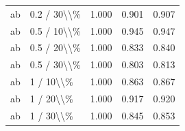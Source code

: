 \begin{table}[!h]
\begin{tabular}[t]{llccc}
\addlinespace
ab & 0.2 / 30\textbackslash{}\textbackslash{}\% & 1.000 & 0.901 & 0.907\\
ab & 0.5 / 10\textbackslash{}\textbackslash{}\% & 1.000 & 0.945 & 0.947\\
ab & 0.5 / 20\textbackslash{}\textbackslash{}\% & 1.000 & 0.833 & 0.840\\
ab & 0.5 / 30\textbackslash{}\textbackslash{}\% & 1.000 & 0.803 & 0.813\\
ab & 1 / 10\textbackslash{}\textbackslash{}\% & 1.000 & 0.863 & 0.867\\
\addlinespace
ab & 1 / 20\textbackslash{}\textbackslash{}\% & 1.000 & 0.917 & 0.920\\
ab & 1 / 30\textbackslash{}\textbackslash{}\% & 1.000 & 0.845 & 0.853\\
\bottomrule
\end{tabular}
\end{table}
